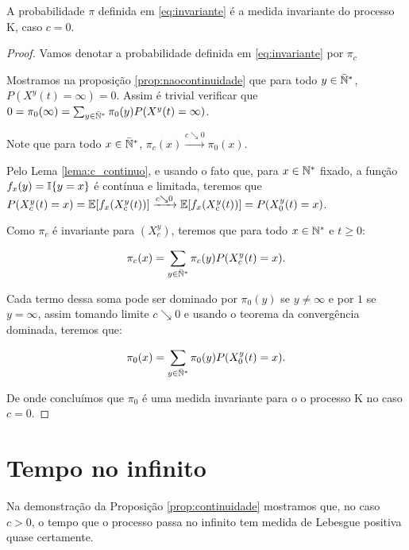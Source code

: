 \begin{proposicao}
  A probabilidade $\pi$ definida em \eqref{eq:invariante} é a medida
  invariante do processo K, caso $c = 0$.
\end{proposicao}
\begin{proof}

  Vamos denotar a probabilidade definida em \eqref{eq:invariante} por
  $\pi_c$

  Mostramos na proposição \ref{prop:naocontinuidade} que para todo $y
  \in {\mathbb{\bar{N}^*}}$, $P(X^y(t) = \infty) = 0$. Assim é trivial verificar que
  $0 = \pi_0(\infty) = \sum_{y\in{\mathbb{\bar{N}^*}}} \pi_0(y) P(X^y(t) =
  \infty)$.

  Note que para todo $x \in {\mathbb{\bar{N}^*}}$, $\pi_c(x) \xrightarrow{c\searrow0}
  \pi_0(x)$.

  Pelo Lema \ref{lema:c_continuo}, e usando o fato que, para $x \in
  {\mathbb{N^*}}$ fixado, a função $f_x(y) = {\mathbb{I}}\{y = x\}$ é contínua e
  limitada, teremos que $P(X^y_c (t) = x) = {\mathbb{E}} [f_x(X^y_c(t))]
  \xrightarrow{c\searrow0} {\mathbb{E}} [f_x(X^y_c(t))] = P(X^y_0(t) = x)$.

  Como $\pi_c$ é invariante para $(X^y_c)$, teremos que para todo $x
  \in {\mathbb{N^*}}$ e $t \geq 0$:

  \begin{align*}
    \pi_c(x) &= \sum_{y \in {\mathbb{\bar{N}^*}}} \pi_c (y) P(X^y_c (t) = x).\\
  \end{align*}

  Cada termo dessa soma pode ser dominado por $\pi_0(y)$ se $y \neq
  \infty$ e por $1$ se $y = \infty$, assim tomando limite $c\searrow0$
  e usando o teorema da convergência dominada, teremos que:

  \begin{align*}
    \pi_0(x) &= \sum_{y \in {\mathbb{\bar{N}^*}}} \pi_0 (y) P(X^y_0 (t) = x).\\
  \end{align*}

  De onde concluímos que $\pi_0$ é uma medida invariante para o o
  processo K no caso $c = 0$.
\end{proof}


\section{Tempo no infinito}
\label{sec:tempo-infinito}

Na demonstração da Proposição \ref{prop:continuidade} mostramos que,
no caso $c > 0$, o tempo que o processo passa no infinito tem medida
de Lebesgue positiva quase certamente.

